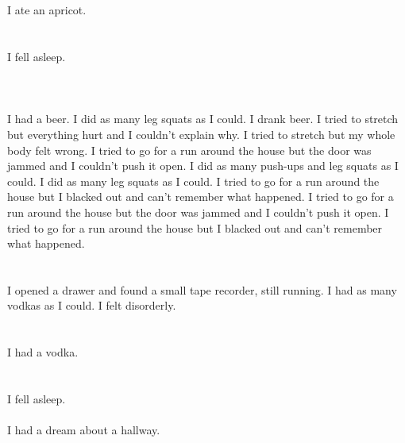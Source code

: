 \documentclass{article}
\begin{document}
    \section{}
    I ate an apricot.  
    \newpage
    
    \section{}
    I fell asleep.\\\\ 
    \newpage
    
    \section{}
    I had a beer. I did as many leg squats as I could. I drank beer.  I tried to stretch but everything hurt and I couldn't explain why.  I tried to stretch but my whole body felt wrong.  I tried to go for a run around the house but the door was jammed and I couldn't push it open.  I did as many push-ups and leg squats as I could.   I did as many leg squats as I could.  I tried to go for a run around the house but I blacked out and can't remember what happened.  I tried to go for a run around the house but the door was jammed and I couldn't push it open.  I tried to go for a run around the house but I blacked out and can't remember what happened.  
    \newpage
    
    \section{}
    I opened a drawer and found a small tape recorder, still running. I had as many vodkas as I could. I felt disorderly.  
    \newpage
    
    \section{}
    I had a vodka.  
    \newpage
    
    \section{}
    I fell asleep.\\\\I had a dream about a hallway.\\\\ 
    \newpage
    
\end{document}
